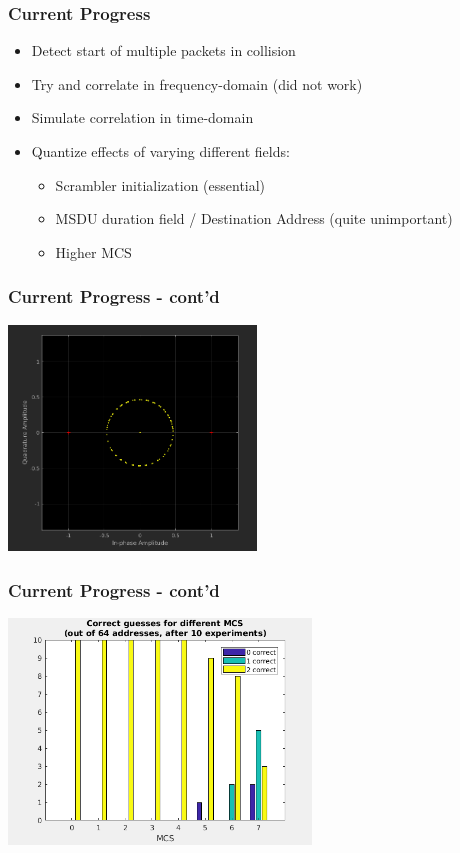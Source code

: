 \documentclass[accentcolor=tud8b,colorbacktitle]{tudbeamer}
\begin{document}
\begin{frame}
\frametitle{Current Progress}
\begin{itemize}
	\setlength\itemsep{1em}
	\item Detect start of multiple packets in collision
	\item Try and correlate in frequency-domain (did not work)
	\item Simulate correlation in time-domain
	\item Quantize effects of varying different fields:
	\begin{itemize}
		\setlength\itemsep{1em}
		\item Scrambler initialization (essential)
		\item MSDU duration field / Destination Address (quite unimportant)
		\item Higher MCS
	\end{itemize}
\end{itemize}
\end{frame}


\begin{frame}
\frametitle{Current Progress - cont'd}
\begin{center}
	\includegraphics[height=6cm]{assets/freq-correlation}
\end{center}
\end{frame}


\begin{frame}
\frametitle{Current Progress - cont'd}
\begin{center}
	\includegraphics[height=6cm]{assets/higher-mcs}
\end{center}
\end{frame}
\end{document}
